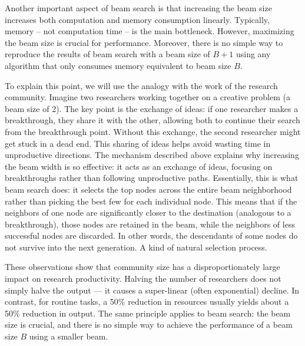 \documentclass[reqno,11pt]{amsart}
\begin{document}
Another important aspect of beam search is that increasing the beam size increases both computation and memory consumption linearly. Typically, memory -- not computation time -- is the main bottleneck. However, maximizing the beam size is crucial for performance.
Moreover, there is no simple way to reproduce the results of beam search with a beam size of $B+1$ using any algorithm that only consumes memory equivalent to beam size $B$.

To explain this point, we will use the analogy with the work of the research community.
Imagine two researchers working together on a creative problem (a beam size of 2). The key point is the exchange of ideas: if one researcher makes a breakthrough, they share it with the other, allowing both to continue their search from the breakthrough point. Without this exchange, the second researcher might get stuck in a dead end. This sharing of ideas helps avoid wasting time in unproductive directions.
The mechanism described above explains why increasing the beam width is so effective: it acts as an exchange of ideas, focusing on breakthroughs rather than following unproductive paths.
Essentially, this is what beam search does: it selects the top nodes across the entire beam neighborhood rather than picking the best few for each individual node. This means that if the neighbors of one node are significantly closer to the destination (analogous to a breakthrough), those nodes are retained in the beam, while the neighbors of less successful nodes are discarded. In other words, the descendants of some nodes do not survive into the next generation. A kind of natural selection process.


These observations show that community size has a disproportionately large impact on research productivity. Halving the number of researchers does not simply halve the output — it causes a super-linear (often exponential) decline. In contrast, for routine tasks, a 50\% reduction in resources usually yields about a 50\% reduction in output. The same principle applies to beam search: the beam size is crucial, and there is no simple way to achieve the performance of a beam size $B$ using a smaller beam.
\end{document}
